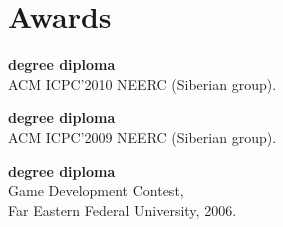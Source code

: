 \documentclass[a4paper]{article}
\begin{document}
	\section{Awards}
	\begin{items}
		\item \textbf{ degree diploma}\\ACM ICPC'2010 NEERC (Siberian group).
		\item \textbf{ degree diploma}\\ACM ICPC'2009 NEERC (Siberian group).
		\item \textbf{ degree diploma}\\Game Development Contest,\\Far Eastern Federal University, 2006.
	\end{items}
\end{document}
